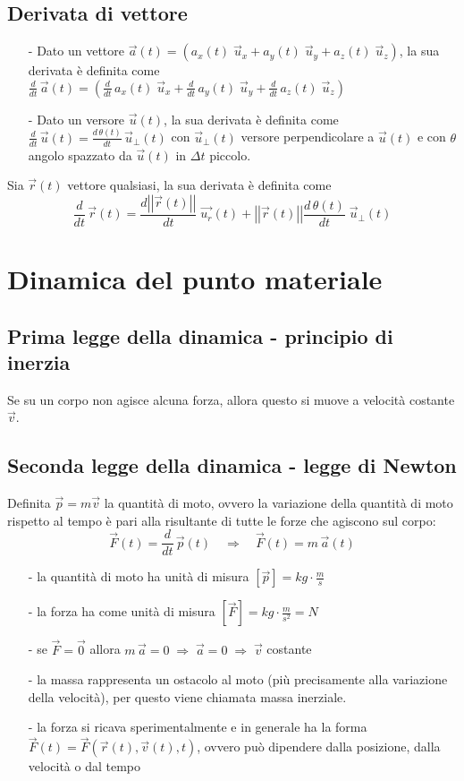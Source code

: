\documentclass[a4paper]{article}
\newcommand\ux{\vec{u}_x}
\newcommand\uy{\vec{u}_y}
\newcommand\uz{\vec{u}_z}
\newcommand\uper{\vec{u}_\perp}
\newcommand\dt{\frac{d}{dt}\,}
\newcommand\vmod[1]{\left|\left|{#1}\right|\right|}
\begin{document}
\subsection{Derivata di vettore}
\begin{itemize}
	\item[-] Dato un vettore \(\vec{a}(t) = (a_x(t) \; \ux + a_y(t) \; \uy + a_z(t) \; \uz)\), la sua derivata è definita come \\
	\(\displaystyle \dt \vec{a}(t) = \left(\dt a_x(t) \; \ux + \dt a_y(t) \; \uy + \dt a_z(t) \; \uz\right)\)
	\item[-] Dato un versore \(\vec{u}(t)\), la sua derivata è definita come \(\displaystyle \dt \vec{u}(t) = \frac{d \, \theta(t)}{dt} \, \uper(t)\)
	con \(\uper(t)\) versore perpendicolare a \(\vec{u}(t)\) e con \(\theta\) angolo spazzato da \(\vec{u}(t)\) in \(\Delta t\) piccolo.
\end{itemize}
Sia \(\vec{r}(t)\) vettore qualsiasi, la sua derivata è definita come
\[\dt \vec{r}(t) = \frac{d \vmod{\vec{r}(t)}}{dt} \; \vec{u_r}(t) + \vmod{\vec{r}(t)} \frac{d \, \theta(t)}{dt} \; \uper(t)\]

\newpage


\section{Dinamica del punto materiale}
\subsection{Prima legge della dinamica - principio di inerzia}
Se su un corpo non agisce alcuna forza, allora questo si muove a velocità costante \(\vec{v}\).

\subsection{Seconda legge della dinamica - legge di Newton}
Definita \(\vec{p} = m \vec{v}\) la quantità di moto, ovvero la variazione della quantità di moto rispetto al tempo è pari alla
risultante di tutte le forze che agiscono sul corpo:
\[\vec{F}(t) = \dt \vec{p}(t) \quad \Rightarrow \quad \vec{F}(t) = m \, \vec{a}(t)\]

\begin{itemize}[topsep=3pt, itemsep=0pt]
	\item[-] la quantità di moto ha unità di misura \(\displaystyle \left[\vec{p}\right] = kg \cdot \frac{m}{s}\)
	\item[-] la forza ha come unità di misura \(\displaystyle \left[\vec{F}\right] = kg \cdot \frac{m}{s^2} = N\)
	\item[-] se \(\vec{F} = \vec{0}\) allora \(m \, \vec{a} = 0 \; \Rightarrow \; \vec{a} = 0 \; \Rightarrow \; \vec{v}\) costante
	\item[-] la massa rappresenta un ostacolo al moto (più precisamente alla variazione della velocità), per questo viene chiamata massa inerziale.
	\item[-] la forza si ricava sperimentalmente e in generale ha la forma \(\vec{F}(t) = \vec{F}(\vec{r}(t), \vec{v}(t), t)\), ovvero può dipendere
	dalla posizione, dalla velocità o dal tempo
\end{itemize}
\end{document}
